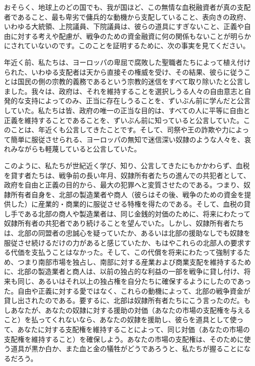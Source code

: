 \documentclass[dvipdfmx, uplatex, tate, landscape]{utbook}
\begin{document}
おそらく、地球上のどの国でも、我が国ほど、この無情な血税融資者が真の支配者であること、最も卑劣で傭兵的な動機から支配していること、表向きの政府、いわゆる大統領、上院議員、下院議員は、彼らの道具にすぎないこと、正義や自由に対する考えや配慮が、戦争のための資金融資に何の関係もないことが明らかにされていないのです。このことを証明するために、次の事実を見てください。

年近く前、私たちは、ヨーロッパの卑屈で腐敗した聖職者たちによって植え付けられた、いわゆる支配者は天から直接その権威を受け、その結果、彼らに従うことは国民の側の宗教的義務であるという宗教的迷信をすべて取り除いたと公言しました。我々は、政府は、それを維持することを選択しうる人々の自由意志と自発的な支持によってのみ、正当に存在しうることを、ずいぶん前に学んだと公言していた。私たちは皆、政府の唯一の正当な目的は、すべての人に平等に自由と正義を維持することであることを、ずいぶん前に知っていると公言していた。このことは、年近くも公言してきたことです。そして、司祭や王の詐欺や力によって簡単に服従させられる、ヨーロッパの無知で迷信深い奴隷のような人々を、哀れみながらも軽蔑していると公言していた。

このように、私たちが世紀近く学び、知り、公言してきたにもかかわらず、血税を貸す者たちは、戦争前の長い年月、奴隷所有者たちの進んでの共犯者として、政府を自由と正義の目的から、最大の犯罪へと変質させたのである。つまり、奴隷所有者自身を、北部の製造業者や商人（彼らはその後、戦争のための資金を提供した）に産業的・商業的に服従させる特権を得たのである。そして、血税の貸し手である北部の商人や製造業者は、同じ金銭的対価のために、将来にわたって奴隷所有者の共犯者であり続けることを望んでいた。しかし、奴隷所有者たちは、北部の同盟者の忠誠心を疑っていたか、あるいは北部の援助なしでも奴隷を服従させ続けるだけの力があると感じていたか、もはやこれらの北部人の要求する代価を支払うことはなかった。そして、この代償を将来にわたって強制するため、つまり南部市場を独占し、南部に対する産業および商業支配を維持するために、北部の製造業者と商人は、以前の独占的な利益の一部を戦争に貸し付け、将来も同じ、あるいはそれ以上の独占権を自分たちに確保するようにしたのであった。自由や正義に対する愛ではなく、これらの動機によって、北部の戦争資金が貸し出されたのである。要するに、北部は奴隷所有者たちにこう言ったのだ。もしあなたが、あなたの奴隷に対する援助の対価（あなたの市場の支配権を与えること）を払ってくれないなら、あなたの奴隷を援助し、彼らを道具として使って、あなたに対する支配権を維持することによって、同じ対価（あなたの市場の支配権を維持すること）を確保しよう。あなたの市場の支配権は、そのために使う道具が黒か白か、また血と金の犠牲がどうであろうと、私たちが握ることになるだろう。
\end{document}
